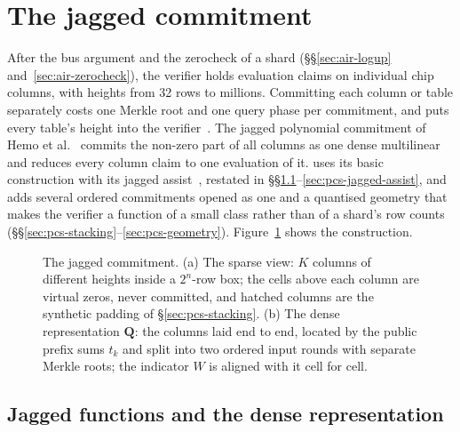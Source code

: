 \section{The jagged commitment}
\label{sec:pcs}

After the bus argument and the zerocheck of a shard (\S\S\ref{sec:air-logup} and~\ref{sec:air-zerocheck}), the verifier holds evaluation claims on individual chip columns, with heights from 32 rows to millions. Committing each column or table separately costs one Merkle root and one query phase per commitment, and puts every table's height into the verifier~\citep[p.~4]{jagged-pcs}. The jagged polynomial commitment of Hemo et al.~\citep{jagged-pcs} commits the non-zero part of all columns as one dense multilinear and reduces every column claim to one evaluation of it. \Ziren{} uses its basic construction with its jagged assist~\citep[Thms.~1.4 and~1.5]{jagged-pcs}, restated in \S\S\ref{sec:pcs-jagged-fn}--\ref{sec:pcs-jagged-assist}, and adds several ordered commitments opened as one and a quantised geometry that makes the verifier a function of a small class rather than of a shard's row counts (\S\S\ref{sec:pcs-stacking}--\ref{sec:pcs-geometry}). Figure~\ref{fig:jagged} shows the construction.

\begin{figure}[t]
\centering
\resizebox{\textwidth}{!}{}
\caption{The jagged commitment. (a) The sparse view: $K$ columns of different heights inside a $2^n$-row box; the cells above each column are virtual zeros, never committed, and hatched columns are the synthetic padding of \S\ref{sec:pcs-stacking}. (b) The dense representation $\mathbf Q$: the columns laid end to end, located by the public prefix sums $t_k$ and split into two ordered input rounds with separate Merkle roots; the indicator $W$ is aligned with it cell for cell.}
\label{fig:jagged}
\end{figure}

\subsection{Jagged functions and the dense representation}
\label{sec:pcs-jagged-fn}

